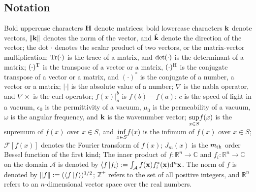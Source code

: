 \documentclass[12pt,draftclsnofoot,journal,onecolumn]{IEEEtran}
\begin{document}
\subsection{Notation}
Bold uppercase characters {\color{red}${\bf H}$} denote matrices;
bold lowercase characters {\color{red}${\bf k}$} denote vectors, {\color{red} $\left\| {\bf k} \right\|$ denotes the norm of the vector, and $\hat{\bf k}$ denote the direction of the vector};
the dot $\cdot$ denotes the scalar product of two vectors, or the matrix-vector multiplication; {\color{red} ${\rm Tr(\cdot)}$ is the trace of a matrix, and ${\rm det}(\cdot)$ is the determinant of a matrix; $(\cdot)^{\rm T}$ is the transpose of a vector or a matrix, $(\cdot)^{\rm H}$ is the conjugate transpose of a vector or a matrix, and $(\cdot)^{*}$ is the conjugate of a number, a vector or a matrix; $|\cdot|$ is the absolute value of a number; $\nabla$ is the nabla operator, and $\nabla \times$ is the curl operator; $f(x)|_a^b$ is $f(b)-f(a)$;}
$c$ is the speed of light in a vacuum{\color{red}, $\epsilon_0$ is the permittivity of a vacuum, $\mu_0$ is the permeability of a vacuum, $\omega$ is the angular frequency, and ${\bf k}$ is the wavenumber vector; $\underset{x \in S}{\rm sup}f(x)$ is the supremum of $f(x)$ over $x\in S$, and $\underset{x \in S}{\rm inf}f(x)$ is the infimum of $f(x)$ over $x\in S$;} 
$\mathscr{F}[f(x)]$ denotes the Fourier transform of $f(x)$; 
$J_m(x)$ is the $m_{\rm th}$ order Bessel function of the first kind; 
The inner product of $f: \mathbb{R}^n \rightarrow \mathbb{C}$ and $f_i: \mathbb{R}^n \rightarrow \mathbb{C}$ on the domain $\mathcal{A}$ is denoted by $\langle f \ket{f_i}:= \int_{\mathcal{A}} f({\bf x}) f_i^*({\bf x}) {\rm d}^n{\bf x}$. The norm of $f$ is denoted by $\left\| f \right\|:=(\langle f \ket{f})^{1/2} $; {\color{red}$\mathbb{Z}^+$ refers to the set of all positive integers, and $\mathbb{R}^{n}$ refers to an 
$n$-dimensional vector space over the real numbers}. 
\end{document}
